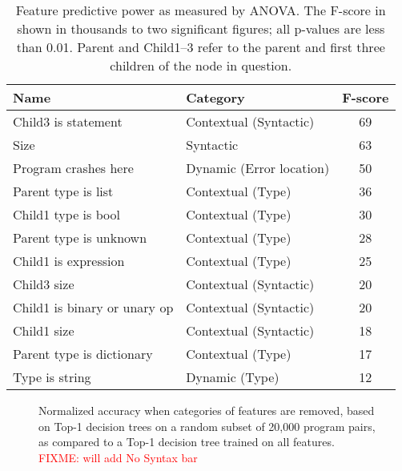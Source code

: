\documentclass[conference]{IEEEtran}
\newcommand{\fixme}[1]{\textcolor{red}{FIXME: #1}}
\begin{document}
\begin{table}[]
\begin{center}
\begin{tabular}{llc}
Name                     & Category                & F-score \\ \bottomrule
Child3 is statement          & Contextual (Syntactic)  & 69 \\
Size                     & Syntactic               & 63 \\
Program crashes here     & Dynamic (Error location)& 50 \\
Parent type is list           & Contextual (Type)       & 36 \\
Child1 type is bool          & Contextual (Type)       & 30 \\
Parent type is unknown        & Contextual (Type)       & 28 \\
Child1 is expression         & Contextual (Type)       & 25 \\
Child3 size                  & Contextual (Syntactic)  & 20 \\
Child1 is binary or unary op & Contextual (Syntactic)  & 20 \\
Child1 size                  & Contextual (Syntactic)  & 18 \\
Parent type is dictionary     & Contextual (Type)       & 17 \\
Type is string           & Dynamic (Type)          & 12 \\
\toprule
\end{tabular}
\end{center}
\caption{Feature predictive power as measured by ANOVA.  The F-score in
shown in
thousands to two significant figures; all p-values are less than 0.01.
Parent and Child1--3 refer to the parent and first three children of
the node in question.}
\label{tab-anova}
\end{table}

\begin{figure}
\caption{Normalized accuracy when categories of features are removed, based
on Top-1 decision trees on a random subset of 20,000 program pairs, as
compared to a Top-1 decision tree trained on all features.
\fixme{will add No Syntax bar}
}
\label{fig-removing-features}
\end{figure}
\end{document}
